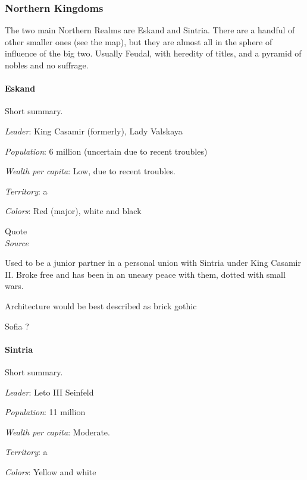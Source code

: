 \subsubsection{Northern Kingdoms}

The two main Northern Realms are Eskand and Sintria. There are a handful of other smaller ones (see the map), but they are almost all in the sphere of influence of the big two. Usually Feudal, with heredity of titles, and a pyramid of nobles and no suffrage.

\paragraph{Eskand}


Short summary.


\textit{Leader}: King Casamir (formerly), Lady Valskaya

\textit{Population}: 6 million (uncertain due to recent troubles)

\textit{Wealth per capita}: Low, due to recent troubles.

\textit{Territory}: a
    
\textit{Colors}: Red (major), white and black


\begin{rpg-quotebox}
Quote \\ \textendash \textit{Source}
\end{rpg-quotebox}



Used to be a junior partner in a personal union with Sintria under King Casamir II.
Broke free and has been in an uneasy peace with them, dotted with small wars.
    

Architecture would be best described as brick gothic



Sofia ?



\paragraph{Sintria}

Short summary.

\textit{Leader}: Leto III Seinfeld

\textit{Population}: 11 million

\textit{Wealth per capita}: Moderate.

\textit{Territory}: a
    
\textit{Colors}: Yellow and white



